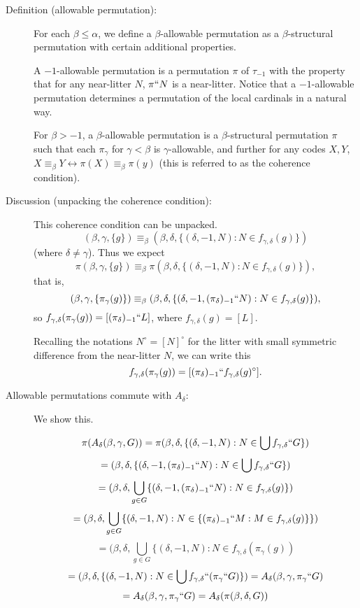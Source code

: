 \documentclass[112pt]{article}
\begin{document}
\begin{description}
\item[Definition (allowable permutation):]  For each $\beta\leq \alpha$, we define a $\beta$-allowable permutation as a $\beta$-structural permutation with certain additional properties.

A $-1$-allowable permutation is a permutation $\pi$ of $\tau_{-1}$ with the property that for any near-litter $N$, $\pi``N$ is a near-litter.  Notice that a $-1$-allowable permutation determines a permutation of the local cardinals in a natural way.

For $\beta>-1$, a $\beta$-allowable permutation is a $\beta$-structural permutation $\pi$ such that each $\pi_\gamma$ for $\gamma<\beta$ is 
$\gamma$-allowable, and further for any codes $X,Y$,  $X \equiv_\beta Y \leftrightarrow \pi(X) \equiv_\beta \pi(y)$ (this is referred to as the coherence condition).



\item[Discussion (unpacking the coherence condition):]  This coherence condition can be unpacked.  $$(\beta,\gamma,\{g\}) \equiv_{\beta} (\beta,\delta,\{(\delta,-1,N):N \in f_{\gamma,\delta}(g)\})$$ (where $\delta\neq \gamma$).  Thus we expect $$\pi(\beta,\gamma,\{g\}) \equiv_{\beta} \pi(\beta,\delta,\{(\delta,-1,N):N \in f_{\gamma,\delta}(g)\}),$$ that is, $$(\beta,\gamma,\{\pi_{\gamma}(g)\}) \equiv_{\beta} (\beta,\delta,\{(\delta,-1,(\pi_{\delta})_{-1}``N):N \in f_{\gamma,\delta}(g)\}),$$ so $f_{\gamma,\delta}(\pi_\gamma(g)) = [(\pi_\delta)_{-1}``L]$, where $f_{\gamma,\delta}(g)=[L]$.  

Recalling the notations $N^\circ=[N]^\circ$ for the litter with small symmetric difference from the near-litter $N$, we can write this $$f_{\gamma,\delta}(\pi_\gamma(g)) = [(\pi_\delta)_{-1}``f_{\gamma,\delta}(g)^\circ].$$

\item[Allowable permutations commute with $A_\delta$:] 

We show this.

$$\pi(A_\delta(\beta,\gamma,G)) = \pi(\beta,\delta,\{(\delta,-1,N):N \in \bigcup f_{\gamma,\delta}``G\})$$ $$ = (\beta,\delta,\{(\delta,-1,(\pi_\delta)_{-1}``N):N \in \bigcup f_{\gamma,\delta}``G\})  $$ $$ =(\beta,\delta,\bigcup_{g \in G} \{(\delta,-1,(\pi_\delta)_{-1}``N):N\in f_{\gamma,\delta}(g)\}) $$ $$ = (\beta,\delta,\bigcup_{g \in G}\{(\delta,-1,N):N \in \{(\pi_{\delta})_{-1}``M:M \in f_{\gamma,\delta}(g)\}\}) $$ $$ = (\beta,\delta,\bigcup_{g \in G}\{(\delta,-1,N):N \in f_{\gamma,\delta}(\pi_\gamma(g))$$ $$ =(\beta,\delta,\{(\delta,-1,N):N \in \bigcup f_{\gamma,\delta}``(\pi_\gamma``G)\})= A_\delta(\beta,\gamma,\pi_\gamma``G) $$ $$= A_\delta(\beta,\gamma,\pi_\gamma``G) = A_\delta(\pi(\beta,\delta,G))$$


\end{description}
\end{document}
